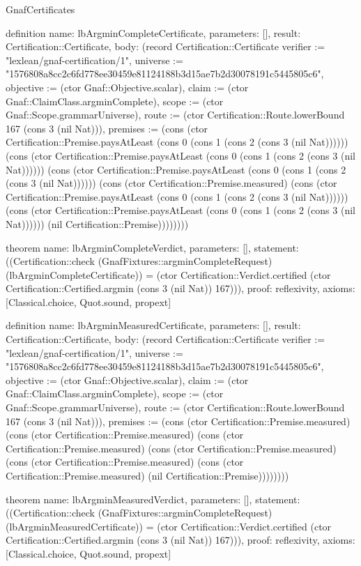 \begin{lexlean}{GnafCertificates}
\begin{semanticmodule}
definition{
  name: lbArgminCompleteCertificate,
  parameters: [],
  result: Certification::Certificate,
  body: (record Certification::Certificate {verifier := "lexlean/gnaf-certification/1", universe := "1576808a8cc2c6fd778ee30459e81124188b3d15ae7b2d30078191c5445805c6", objective := (ctor Gnaf::Objective.scalar), claim := (ctor Gnaf::ClaimClass.argminComplete), scope := (ctor Gnaf::Scope.grammarUniverse), route := (ctor Certification::Route.lowerBound 167 (cons 3 (nil Nat))), premises := (cons (ctor Certification::Premise.paysAtLeast (cons 0 (cons 1 (cons 2 (cons 3 (nil Nat)))))) (cons (ctor Certification::Premise.paysAtLeast (cons 0 (cons 1 (cons 2 (cons 3 (nil Nat)))))) (cons (ctor Certification::Premise.paysAtLeast (cons 0 (cons 1 (cons 2 (cons 3 (nil Nat)))))) (cons (ctor Certification::Premise.measured) (cons (ctor Certification::Premise.paysAtLeast (cons 0 (cons 1 (cons 2 (cons 3 (nil Nat)))))) (cons (ctor Certification::Premise.paysAtLeast (cons 0 (cons 1 (cons 2 (cons 3 (nil Nat)))))) (nil Certification::Premise)))))))})
}

theorem{
  name: lbArgminCompleteVerdict,
  parameters: [],
  statement: ((Certification::check (GnafFixtures::argminCompleteRequest) (lbArgminCompleteCertificate)) = (ctor Certification::Verdict.certified (ctor Certification::Certified.argmin (cons 3 (nil Nat)) 167))),
  proof: reflexivity{},
  axioms: [Classical.choice, Quot.sound, propext]
}

definition{
  name: lbArgminMeasuredCertificate,
  parameters: [],
  result: Certification::Certificate,
  body: (record Certification::Certificate {verifier := "lexlean/gnaf-certification/1", universe := "1576808a8cc2c6fd778ee30459e81124188b3d15ae7b2d30078191c5445805c6", objective := (ctor Gnaf::Objective.scalar), claim := (ctor Gnaf::ClaimClass.argminComplete), scope := (ctor Gnaf::Scope.grammarUniverse), route := (ctor Certification::Route.lowerBound 167 (cons 3 (nil Nat))), premises := (cons (ctor Certification::Premise.measured) (cons (ctor Certification::Premise.measured) (cons (ctor Certification::Premise.measured) (cons (ctor Certification::Premise.measured) (cons (ctor Certification::Premise.measured) (cons (ctor Certification::Premise.measured) (nil Certification::Premise)))))))})
}

theorem{
  name: lbArgminMeasuredVerdict,
  parameters: [],
  statement: ((Certification::check (GnafFixtures::argminCompleteRequest) (lbArgminMeasuredCertificate)) = (ctor Certification::Verdict.certified (ctor Certification::Certified.argmin (cons 3 (nil Nat)) 167))),
  proof: reflexivity{},
  axioms: [Classical.choice, Quot.sound, propext]
}


\end{semanticmodule}
\end{lexlean}
